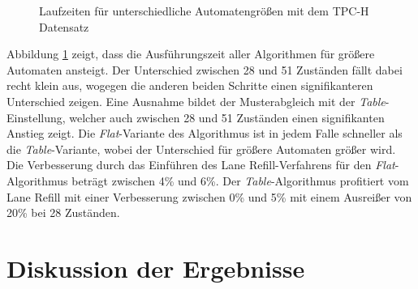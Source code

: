\begin{figure}[ht]
	\centering
	\caption{Laufzeiten für unterschiedliche Automatengrößen mit dem TPC-H Datensatz}
	\label{fig:regex_p_name}
\end{figure}

Abbildung \ref{fig:regex_p_name} zeigt, dass die Ausführungszeit aller Algorithmen für größere Automaten ansteigt.
Der Unterschied zwischen 28 und 51 Zuständen fällt dabei recht klein aus, wogegen die anderen beiden Schritte einen signifikanteren Unterschied zeigen.
Eine Ausnahme bildet der Musterabgleich mit der \emph{Table}-Einstellung, welcher auch zwischen 28 und 51 Zuständen einen signifikanten Anstieg zeigt.
Die \emph{Flat}-Variante des Algorithmus ist in jedem Falle schneller als die \emph{Table}-Variante, wobei der Unterschied für größere Automaten größer wird.
Die Verbesserung durch das Einführen des Lane Refill-Verfahrens für den \emph{Flat}-Algorithmus beträgt zwischen 4\% und 6\%.
Der \emph{Table}-Algorithmus profitiert vom Lane Refill mit einer Verbesserung zwischen 0\% und 5\% mit einem Ausreißer von 20\% bei 28 Zuständen.

\section{Diskussion der Ergebnisse}

